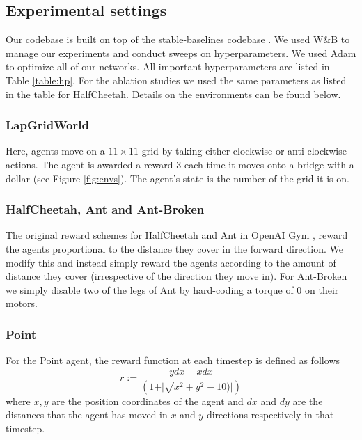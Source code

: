 \subsection{Experimental settings}
\label{a:es}
Our codebase is built on top of the stable-baselines codebase \cite{hill2018stablebaselines}. We used W\&B \citep{wandb2020} to manage our experiments and conduct sweeps on hyperparameters. We used Adam \citep{kingma2015adam} to optimize all of our networks. All important hyperparameters are listed in Table \ref{table:hp}. For the ablation studies we used the same parameters as listed in the table for HalfCheetah. Details on the environments can be found below.

\subsubsection{LapGridWorld}
Here, agents move on a $11 \times 11$ grid by taking either clockwise or anti-clockwise actions. The agent is awarded a reward $3$ each time it moves onto a bridge with a dollar (see Figure \ref{fig:envs}). The agent's state is the number of the grid it is on.

\subsubsection{HalfCheetah, Ant and Ant-Broken}
The original reward schemes for HalfCheetah and Ant in OpenAI Gym \citep{brockman2016openai}, reward the agents proportional to the distance they cover in the forward direction. We modify this and instead simply reward the agents according to the amount of distance they cover (irrespective of the direction they move in). For Ant-Broken we simply disable two of the legs of Ant by hard-coding a torque of $0$ on their motors.

\subsubsection{Point}
For the Point agent, the reward function at each timestep is defined as follows
\begin{equation}
    r := \frac{ydx - xdx}{\left(1 + \vert \sqrt{x^2+y^2}-10)\vert\right)}
\end{equation}
where $x, y$ are the position coordinates of the agent and $dx$ and $dy$ are the distances that the agent has moved in $x$ and $y$ directions respectively in that timestep.

